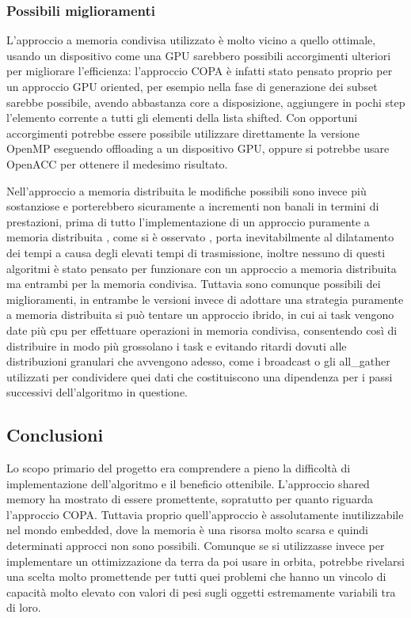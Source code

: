 \documentclass[11pt]{article}
\begin{document}
\subsubsection{Possibili miglioramenti}

L'approccio a memoria condivisa utilizzato è molto vicino a quello ottimale, usando un dispositivo come una GPU sarebbero possibili accorgimenti ulteriori per migliorare l'efficienza: l'approccio COPA è infatti stato pensato proprio per un approccio GPU oriented, per esempio nella fase di generazione dei subset sarebbe possibile, avendo abbastanza core a disposizione, aggiungere in pochi step l'elemento corrente a tutti gli elementi della lista shifted. Con opportuni accorgimenti potrebbe essere possibile utilizzare
direttamente la versione OpenMP eseguendo offloading a un dispositivo GPU, oppure si potrebbe usare OpenACC per ottenere il medesimo risultato. 

Nell'approccio a memoria distribuita le modifiche possibili sono invece più sostanziose e porterebbero sicuramente a incrementi non banali in termini di prestazioni, prima di tutto l'implementazione di un approccio puramente a memoria distribuita , come si è osservato , porta inevitabilmente al dilatamento dei tempi a causa degli elevati tempi di trasmissione, inoltre nessuno di questi algoritmi è stato pensato per funzionare con un approccio a memoria distribuita ma entrambi per la memoria condivisa. Tuttavia sono comunque possibili dei miglioramenti, in entrambe le versioni invece di adottare una strategia puramente a memoria distribuita si può tentare un approccio ibrido, in cui ai task vengono date più cpu per effettuare operazioni in memoria condivisa, consentendo così di distribuire in modo più grossolano i task e evitando ritardi dovuti alle distribuzioni granulari che avvengono adesso, come i broadcast o gli all\_gather utilizzati per condividere quei dati che costituiscono una dipendenza per i passi successivi dell'algoritmo in questione.

\subsection{Conclusioni}

Lo scopo primario del progetto era comprendere a pieno la difficoltà di implementazione dell'algoritmo e il beneficio ottenibile. L'approccio shared memory ha mostrato di essere promettente, sopratutto per quanto riguarda l'approccio COPA. Tuttavia proprio quell'approccio è assolutamente inutilizzabile nel mondo embedded, dove la memoria è una risorsa molto scarsa e quindi determinati approcci non sono possibili. Comunque se si utilizzasse invece per implementare un ottimizzazione da terra da poi usare in orbita, potrebbe rivelarsi una scelta molto promettende per tutti quei problemi che hanno un vincolo di capacità molto elevato con valori di pesi sugli oggetti estremamente variabili tra di loro. 



\end{document}
